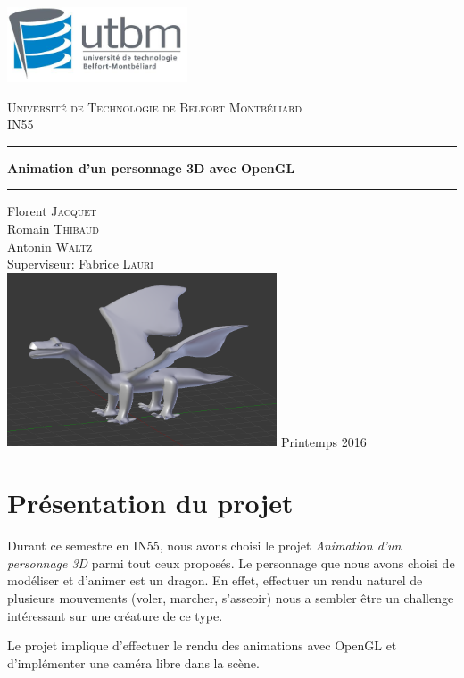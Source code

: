 \documentclass[a4paper]{report}
\begin{document}
\begin{titlepage}
    \includegraphics[width=0.4\textwidth]{logo_utbm.png}
    \begin{center}
        \textsc{\LARGE Université de Technologie de Belfort Montbéliard}\\[1cm]
        \textsc{\Large IN55}\\
        \rule{\linewidth}{0.5mm}
        { \huge \bfseries Animation d'un personnage 3D avec OpenGL\\[0.4cm] }
        \rule{\linewidth}{0.5mm}
        \vskip1cm
        Florent \textsc{Jacquet}\\
	Romain \textsc{Thibaud}\\
        Antonin \textsc{Waltz}\\
        Superviseur: Fabrice \textsc{Lauri}\\
        \vskip1cm
        \includegraphics[width=0.6\textwidth]{dragon_front_page.png}
        \vfill
        {\large Printemps 2016}
    \end{center}
\end{titlepage}

\newpage
\tableofcontents
\listoffigures
\newpage
\chapter{Présentation du projet}
\par
Durant ce semestre en IN55, nous avons choisi le projet \textit{Animation d'un personnage 3D} parmi tout ceux proposés. Le personnage que nous avons choisi de modéliser et d'animer est un dragon. En effet, effectuer un rendu naturel de plusieurs mouvements (voler, marcher, s'asseoir) nous a sembler être un challenge intéressant sur une créature de ce type.
\par
Le projet implique d'effectuer le rendu des animations avec OpenGL et d'implémenter une caméra libre dans la scène.
 
\end{document}
